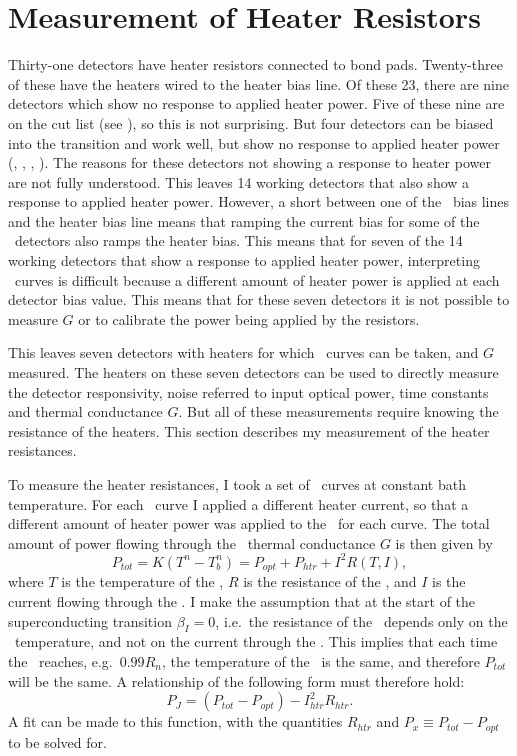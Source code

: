 \section{Measurement of Heater Resistors} \label{sec:heater-r}

Thirty-one detectors have heater resistors connected to bond pads.
Twenty-three of these have the heaters wired to the heater bias line.
Of these 23, there are nine detectors which show no response to applied heater power.
Five of these nine are on the cut list (see ), so this is not surprising.
But four detectors can be biased into the transition and work well, but show no response to applied heater power (, , , ).
The reasons for these detectors not showing a response to heater power are not fully understood.
This leaves 14 working detectors that also show a response to applied heater power.
However, a short between one of the \TES\ bias lines and the heater bias line means that ramping the current bias for some of the \TES\ detectors also ramps the heater bias.
This means that for seven of the 14 working detectors that show a response to applied heater power, interpreting \IV\ curves is difficult because a different amount of heater power is applied at each detector bias value.
This means that for these seven detectors it is not possible to measure $G$ or to calibrate the power being applied by the resistors.

This leaves seven detectors with heaters for which \IV\ curves can be taken, and $G$ measured.
The heaters on these seven detectors can be used to directly measure the detector responsivity, noise referred to input optical power, time constants and thermal conductance $G$.
But all of these measurements require knowing the resistance of the heaters.
This section describes my measurement of the heater resistances.

To measure the heater resistances, I took a set of \IV\ curves at constant bath temperature.
For each \IV\ curve I applied a different heater current, so that a different amount of heater power was applied to the \TES\ for each curve.
The total amount of power flowing through the \TES\ thermal conductance $G$ is then given by
\begin{equation}\label{eqn:tes-ptot}
P_{tot} = K(T^n - T_b^n) = P_{opt} + P_{htr} + I^2 R(T,I),
\end{equation}
where $T$ is the temperature of the \TES, $R$ is the resistance of the \TES, and $I$ is the current flowing through the \TES.
I make the assumption that at the start of the superconducting transition $\beta_I = 0$, i.e.\ the resistance of the \TES\ depends only on the \TES\ temperature, and not on the current through the \TES.
This implies that each time the \TES\ reaches, e.g.\ $0.99R_n$, the temperature of the \TES\ is the same, and therefore $P_{tot}$ will be the same.
A relationship of the following form must therefore hold:
\begin{equation}\label{eqn:rhtr-fit}
P_{J} = (P_{tot} - P_{opt}) - I_{htr}^2 R_{htr}.
\end{equation}
A fit can be made to this function, with the quantities $R_{htr}$ and $P_{x} \equiv P_{tot} - P_{opt}$ to be solved for.

